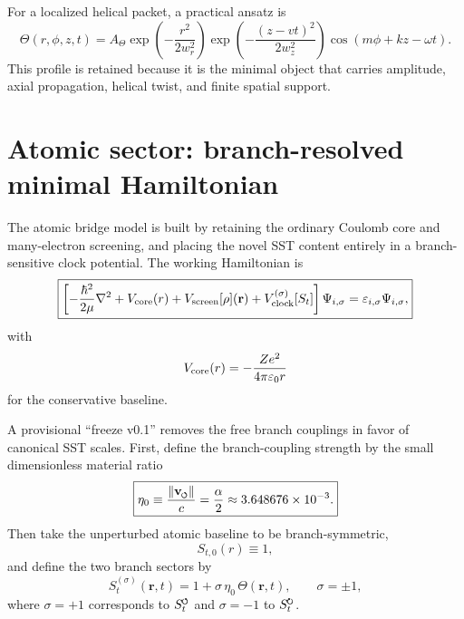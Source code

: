 \documentclass[11pt,a4paper]{article}
\newcommand{\swirlarrow}{\mathchoice{\mkern-2mu\scriptstyle\boldsymbol{\circlearrowleft}}{\mkern-2mu\scriptstyle\boldsymbol{\circlearrowleft}}{\mkern-2mu\scriptscriptstyle\boldsymbol{\circlearrowleft}}{\mkern-2mu\scriptscriptstyle\boldsymbol{\circlearrowleft}}}
\newcommand{\swirlarrowcw}{\mathchoice{\mkern-2mu\scriptstyle\boldsymbol{\circlearrowright}}{\mkern-2mu\scriptstyle\boldsymbol{\circlearrowright}}{\mkern-2mu\scriptscriptstyle\boldsymbol{\circlearrowright}}{\mkern-2mu\scriptscriptstyle\boldsymbol{\circlearrowright}}}
\newcommand{\vswirl}{\mathbf{v}_{\swirlarrow}}
\newcommand{\SwirlClock}{S_t^{\swirlarrow}}
\newcommand{\SwirlClockcw}{S_t^{\swirlarrowcw}}
\begin{document}
For a localized helical packet, a practical ansatz is
\begin{equation}
\label{eq:ThetaPacket}
\Theta(r,\phi,z,t)
=
A_\Theta
\exp\!\left(-\frac{r^2}{2w_r^2}\right)
\exp\!\left(-\frac{(z-vt)^2}{2w_z^2}\right)
\cos\!\left(m\phi+kz-\omega t\right).
\end{equation}
This profile is retained because it is the minimal object that carries amplitude, axial propagation, helical twist, and finite spatial support.

\section{Atomic sector: branch-resolved minimal Hamiltonian}
The atomic bridge model is built by retaining the ordinary Coulomb core and many-electron screening, and placing the novel SST content entirely in a branch-sensitive clock potential. The working Hamiltonian is
\begin{equation}
\label{eq:master-H}
\boxed{
\left[
-\frac{\hbar^2}{2\mu}\nabla^2
+V_{\rm core}(r)
+V_{\rm screen}[\rho](\mathbf r)
+V_{\rm clock}^{(\sigma)}[S_t]
\right]\Psi_{i,\sigma}
=\varepsilon_{i,\sigma}\Psi_{i,\sigma},
}
\end{equation}
with
\begin{equation}
\label{eq:Vcore}
V_{\rm core}(r)=-\frac{Ze^2}{4\pi\varepsilon_0 r}
\end{equation}
for the conservative baseline.

A provisional ``freeze v0.1'' removes the free branch couplings in favor of canonical SST scales. First, define the branch-coupling strength by the small dimensionless material ratio
\begin{equation}
\label{eq:eta0}
\boxed{
\eta_0 \equiv \frac{\lVert\vswirl\rVert}{c} = \frac{\alpha}{2} \approx 3.648676\times 10^{-3}.
}
\end{equation}
Then take the unperturbed atomic baseline to be branch-symmetric,
\begin{equation}
\label{eq:St0freeze}
S_{t,0}(r)\equiv 1,
\end{equation}
and define the two branch sectors by
\begin{equation}
\label{eq:StBranches}
\boxed{
S_t^{(\sigma)}(\mathbf r,t)=1+\sigma\,\eta_0\,\Theta(\mathbf r,t),
\qquad
\sigma=\pm 1,
}
\end{equation}
where $\sigma=+1$ corresponds to $\SwirlClock$ and $\sigma=-1$ to $\SwirlClockcw$.
\end{document}
